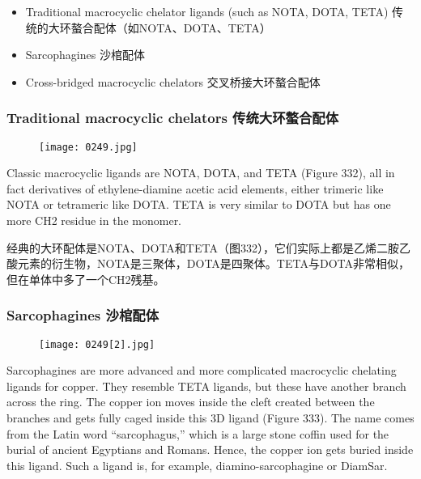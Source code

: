 \documentclass[dvipsnames, svgnames,a4paper,11pt]{article}
\begin{document}
\begin{itemize}
  \item Traditional macrocyclic chelator ligands (such as NOTA, DOTA, TETA) 传统的大环螯合配体（如NOTA、DOTA、TETA）
  \item Sarcophagines 沙棺配体
  \item Cross-bridged macrocyclic chelators 交叉桥接大环螯合配体
\end{itemize}

\subsubsection{Traditional macrocyclic chelators 传统大环螯合配体}  

\begin{figure}[h]
	\centering
    \texttt{[image: 0249.jpg]}  
     \label{fig332}
\end{figure}

Classic macrocyclic ligands are NOTA, DOTA, and TETA (Figure 332), all in fact derivatives of ethylene-diamine acetic acid elements, either trimeric like NOTA or tetrameric like DOTA. TETA is very similar to DOTA but has one more CH2 residue in the monomer.

经典的大环配体是NOTA、DOTA和TETA（图332），它们实际上都是乙烯二胺乙酸元素的衍生物，NOTA是三聚体，DOTA是四聚体。TETA与DOTA非常相似，但在单体中多了一个CH2残基。



\subsubsection{Sarcophagines 沙棺配体}  

\begin{figure}[h]
	\centering
    \texttt{[image: 0249[2].jpg]}  
     \label{fig333}
\end{figure}


Sarcophagines are more advanced and more complicated macrocyclic chelating ligands for copper. They resemble TETA ligands, but these have another branch across the ring. The copper ion moves inside the cleft created between the branches and gets fully caged inside this 3D ligand (Figure 333). The name comes from the Latin word “sarcophagus,” which is a large stone coffin used for the burial of ancient Egyptians and Romans. Hence, the copper ion gets buried inside this ligand. Such a ligand is, for example, diamino-sarcophagine or DiamSar.
\end{document}
